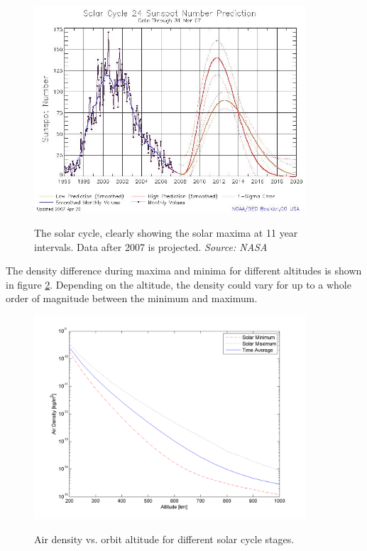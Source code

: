 \begin{figure}[ht!]
\centering
\includegraphics[width=0.9\textwidth, angle=0]{img/solarCycle.jpg}
\label{fig:solarCycle}
\caption{The solar cycle, clearly showing the solar maxima at 11 year intervals. Data after 2007 is projected. \emph{Source: NASA} }
\end{figure}

The density difference during maxima and minima for different altitudes is shown in figure \ref{fig:densityProfile}. Depending on the altitude, the density could vary for up to a whole order of magnitude between the minimum and maximum.

\begin{figure}[ht!]
\centering
\includegraphics[width=0.9\textwidth, angle=0]{img/densityAltitude.png}
\label{fig:densityProfile}
\caption{Air density vs. orbit altitude for different solar cycle stages.}
\end{figure}


